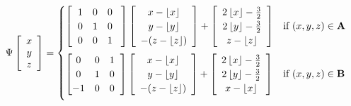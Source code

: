 \documentclass[]{article}
\begin{document}
\begin{equation}
\Psi\left[\begin{array}{c}
	x\\y\\z
\end{array}\right] 
= 
\begin{cases}
	\left[ \hspace{2mm} \begin{matrix}
		1 & 0 & 0 \\
		0 & 1 & 0 \\
		0 & 0 & 1
	\end{matrix}\hspace{3mm}\right]

	\left[\begin{array}{c}
	x - \left\lfloor x \right\rfloor
	\\ y- \left\lfloor y \right\rfloor
	\\ -(z - \left\lfloor z \right\rfloor)
	\end{array} \right]
	+
	\left[\begin{array}{c}
		2 \left\lfloor x \right\rfloor - \frac{3}{2}
		\\ 2\left\lfloor y \right\rfloor - \frac{3}{2}
		\\ z - \left\lfloor z \right\rfloor
	\end{array} \right]
		& \text{if } (x,y,z)\in \mathbf{A}	\vspace{2mm}
	\\
		
		
	\left[ \begin{matrix}
	0 & 0 & 1 \\
	0 & 1 & 0 \\
	-1 & 0 & 0
	\end{matrix}\hspace{2mm}\right]
	\left[\begin{array}{c}
		x - \left\lfloor x \right\rfloor
		\\ y- \left\lfloor y \right\rfloor
		\\ -(z - \left\lfloor z \right\rfloor)
		\end{array} \right]
	+
		\left[\begin{array}{c}
			2 \left\lfloor x \right\rfloor - \frac{3}{2}
			\\ 2\left\lfloor y \right\rfloor - \frac{3}{2}
			\\ x - \left\lfloor x \right\rfloor
		\end{array} \right]
			& \text{if } (x,y,z)\in \mathbf{B}	\vspace{2mm}
	\\
	

\end{cases}
\end{equation}
\end{document}
